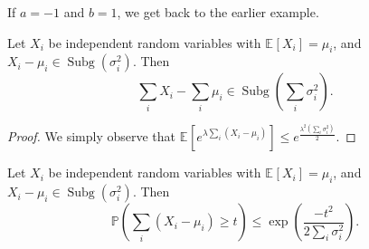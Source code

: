\begin{note}
	If \(a = -1\) and \(b = 1\), we get back to the earlier example.
\end{note}

\begin{lemma}
	Let \(X_i\) be independent random variables with \(\mathbb{E}_{}\left[X_i \right] = \mu _i\), and \(X_i - \mu _i \in \mathop{\mathrm{Subg}}\left( \sigma _i^2 \right)  \). Then
	\[
		\sum_{i} X_i - \sum_{i} \mu _i \in \mathop{\mathrm{Subg}}\left( \sum_{i} \sigma _i^2 \right) .
	\]
\end{lemma}
\begin{proof}
	We simply observe that \(\mathbb{E}_{}\left[e^{\lambda \sum_{i} (X_i - \mu _i)} \right] \leq e^{\frac{\lambda ^2 (\sum_{i} \sigma _i^2)}{2}}\).
\end{proof}

\begin{lemma}\label{lma:Hoeffding-inequality}
	Let \(X_i\) be independent random variables with \(\mathbb{E}_{}\left[X_i \right] = \mu _i\), and \(X_i - \mu _i \in \mathop{\mathrm{Subg}}(\sigma _i^2) \). Then
	\[
		\mathbb{P} \left( \sum_{i} (X_i - \mu _i) \geq t \right)  \leq \exp (\frac{-t^2}{2 \sum_{i} \sigma _i^2}).
	\]
\end{lemma}